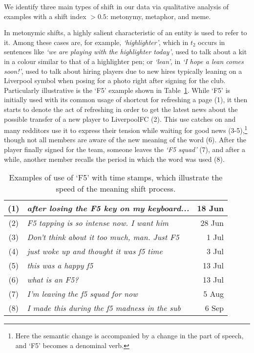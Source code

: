 We identify three main types of shift in our data via qualitative analysis of examples with a shift index $> 0.5$: metonymy, metaphor, and meme.  

In metonymic shifts, a highly salient characteristic of an entity is used to refer to it. Among these cases are, for example, {\em `highlighter'}, which in $t_2$ occurs in sentences like \textit{`we are playing with the highlighter today'},
used to talk about a kit in a colour similar to that of a highlighter pen; or {\em `lean'}, in \textit{`I hope a lean comes soon!'},
used to talk about hiring players due to new hires typically leaning on a Liverpool symbol when posing for a photo right after signing for the club. Particularly illustrative is the `F5' example shown in
Table~\ref{table:f5}. While `F5' is initially used with its common usage of shortcut for refreshing a page (1), it then starts to denote the act of refreshing in order to get the latest news about the possible transfer of a new player to LiverpoolFC (2). This use catches on and many redditors use it to express their tension while waiting for good news (3-5),\footnote{Here the semantic change is accompanied by a change in the part of speech, and `F5' becomes a denominal verb.}
though not all members are aware of the new meaning of the word (6). After the player finally signed for the team, someone leaves the {\em `F5 squad'} (7), and after a while, another member recalls the period in which the word was used (8).


\begin{table}[t]\centering   \small
    \begin{tabular}{@{}cp{5.5cm}r@{}}
        \hline
        (1) & \em after losing the F5 key on my keyboard... & 18 Jun\\\hline
        (2) & \em F5 tapping is so intense now. I want him & 28 Jun\\\hline
        (3) & \em Don't think about it too much, man. Just F5 & 1 Jul\\\hline
        (4) & \em just woke up and thought it was f5 time & 3 Jul\\\hline
        (5) & \em this was a happy f5 & 13 Jul\\\hline
        (6) & \em what is an F5? & 13 Jul \\\hline
        (7) & \em I'm leaving the f5 squad for now & 5 Aug\\\hline
        (8) & \em I made this during the f5 madness in the sub & 6 Sep\\\hline      
    \end{tabular}
    \vspace*{-0.2cm}
    \caption{Examples of use of `F5' with time stamps, which illustrate the speed of the meaning shift process.}
    \vspace*{-0.2cm}
     \label{table:f5}
\end{table}


